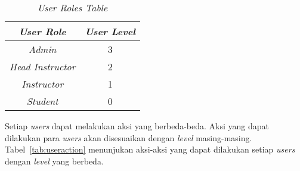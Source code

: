 \begin{table}[H] %
	\centering 
	\caption{\textit{User Roles Table}}
	\label{tab:userrole}
	\begin{tabular}{|c|c|}
		\hline
		\textit{\textbf{User Role}} & \textit{\textbf{User Level}} \\
		\hline
		\textit{Admin} & 3 \\
		\hline
		\textit{Head Instructor} & 2 \\
		\hline
		\textit{Instructor} & 1 \\
		\hline
		\textit{Student} & 0 \\
		\hline		
	\end{tabular} 
\end{table}

Setiap \textit{users} dapat melakukan aksi yang berbeda-beda. Aksi yang dapat dilakukan para \textit{users} akan disesuaikan dengan \textit{level} masing-masing. Tabel~\ref{tab:useraction} menunjukan aksi-aksi yang dapat dilakukan setiap \textit{users} dengan \textit{level} yang berbeda.
